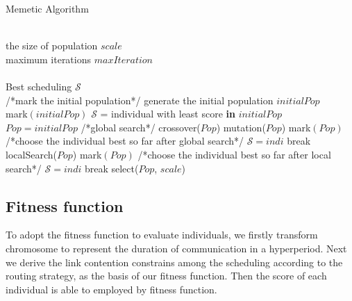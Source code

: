 \documentclass[journal]{IEEEtran}
\newcommand{\calS}{\mathcal{S}}
\begin{document}
\begin{algorithm}[tb]
	\caption{Memetic Algorithm}
	\renewcommand{\algorithmicrequire}{\textbf{Input:}}
	\renewcommand{\algorithmicensure}{\textbf{Output:}}
	\begin{algorithmic}[1]
		\REQUIRE~~\\
		the size of population $scale$\\
		maximum iterations $maxIteration$\\
		\ENSURE~~\\
		Best scheduling $\calS$\\
			\STATE /*mark the initial population*/
				\STATE generate the	initial population $initialPop$\\
				\STATE mark$(initialPop)$
				\STATE $\mathcal{S}$ = individual with least score \textbf{in} $initialPop$
				\STATE $Pop = initialPop$
			\ELSE
			\STATE /*global search*/
				\STATE crossover($Pop$)
				\STATE mutation($Pop$)
				\STATE mark$(Pop)$
			\ENDIF
			\STATE /*choose the individual best so far after global search*/
					\STATE $\mathcal{S}=indi$
				\ENDIF
					\STATE break
				\ENDIF
			\ENDFOR	
			\STATE localSearch($Pop$)
			\STATE mark$(Pop)$
			\STATE /*choose the individual best so far after local search*/
					\STATE $\mathcal{S}=indi$
				\ENDIF
					\STATE break
				\ENDIF
			\ENDFOR			
			\STATE select($Pop$, $scale$)
		\ENDFOR
	\end{algorithmic}
\end{algorithm}	

\subsection{Fitness function \label{s:fit}}

To adopt the fitness function to evaluate individuals,
 we firstly transform chromosome to represent the duration of communication in a hyperperiod.
Next we derive the link contention constrains among the scheduling according to the routing strategy,
 as the basis of our fitness function.
Then the score of each individual is able to employed by fitness function.
\end{document}

